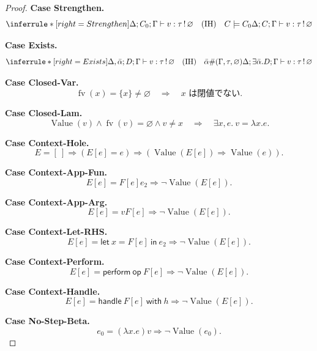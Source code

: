 \documentclass[a4paper,11pt]{article}
\theoremstyle{definition}
\newenvironment{Case}[1]{\par\smallskip\noindent\textbf{Case #1.}\enspace\ignorespaces}{\par}
\newcommand{\FV}{\operatorname{fv}}
\newcommand{\op}{\mathsf{op}}
\newcommand{\emp}{\varnothing}
\newcommand{\jj}[6]{#1;#2;#3\vdash #4:#5\,!\,#6}
\newcommand{\J}[3]{\jj{\Delta}{C}{\Gamma}{#1}{#2}{#3}}
\newcommand{\lete}[3]{\mathsf{let}\ #1=#2\ \mathsf{in}\ #3}
\newcommand{\perform}[2]{\mathsf{perform}\ #1\ #2}
\newcommand{\handle}[2]{\mathsf{handle}\ #1\ \mathsf{with}\ #2}
\newcommand{\Val}{\operatorname{Value}}
\begin{document}
\begin{proof}
\begin{Case}{Strengthen}
\[
\inferrule*[right=Strengthen]{\jj\Delta{C_0}\Gamma v\tau\emp\quad(\mathrm{IH})\quad C\models C_0}{\J v\tau\emp}
\]
\end{Case}

\begin{Case}{Exists}
\[
\inferrule*[right=Exists]{\jj{\Delta,\bar\alpha}D\Gamma v\tau\emp\quad(\mathrm{IH})\quad\bar\alpha\#(\Gamma,\tau,\emp)}{\jj\Delta{\exists\bar\alpha.D}\Gamma v\tau\emp}
\]
\end{Case}

\begin{Case}{Closed-Var}
\[\FV(x)=\{x\}\ne\emp\quad\Longrightarrow\quad x\text{ は閉値でない}.\]
\end{Case}

\begin{Case}{Closed-Lam}
\[\Val(v)\land\FV(v)=\emp\land v\ne x\quad\Longrightarrow\quad\exists x,e.\ v=\lambda x.e.\]
\end{Case}

\begin{Case}{Context-Hole}
\[E=[\ ]\Longrightarrow(E[e]=e)\Longrightarrow(\Val(E[e])\Rightarrow\Val(e)).\]
\end{Case}

\begin{Case}{Context-App-Fun}
\[E[e]=F[e]e_2\Longrightarrow\neg\Val(E[e]).\]
\end{Case}

\begin{Case}{Context-App-Arg}
\[E[e]=vF[e]\Longrightarrow\neg\Val(E[e]).\]
\end{Case}

\begin{Case}{Context-Let-RHS}
\[E[e]=\lete x{F[e]}{e_2}\Longrightarrow\neg\Val(E[e]).\]
\end{Case}

\begin{Case}{Context-Perform}
\[E[e]=\perform\op{F[e]}\Longrightarrow\neg\Val(E[e]).\]
\end{Case}

\begin{Case}{Context-Handle}
\[E[e]=\handle{F[e]}h\Longrightarrow\neg\Val(E[e]).\]
\end{Case}

\begin{Case}{No-Step-Beta}
\[e_0=(\lambda x.e)v\Longrightarrow\neg\Val(e_0).\]
\end{Case}


\end{proof}
\end{document}
